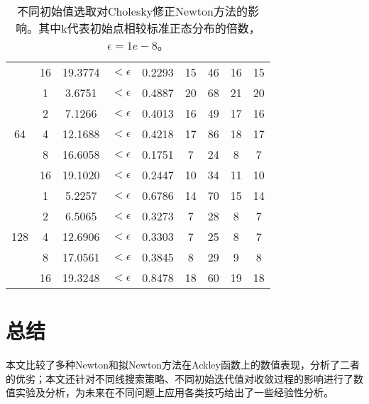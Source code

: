 \documentclass{article}
\begin{document}
\begin{table*}[h]
\begin{tabular}{c c c c c c c c c}
    & 16 & 19.3774 & $<\epsilon$ & 0.2293 & 15 & 46 & 16 & 15 \\
    \cmidrule(lr){1-9}
    \multirow{5}{*}{64} &
       1 &  3.6751 & $<\epsilon$ & 0.4887 & 20 & 68 & 21 & 20 \\
    &  2 &  7.1266 & $<\epsilon$ & 0.4013 & 16 & 49 & 17 & 16 \\
    &  4 & 12.1688 & $<\epsilon$ & 0.4218 & 17 & 86 & 18 & 17 \\
    &  8 & 16.6058 & $<\epsilon$ & 0.1751 &  7 & 24 &  8 & 7 \\
    & 16 & 19.1020 & $<\epsilon$ & 0.2447 & 10 & 34 & 11 & 10 \\
    \cmidrule(lr){1-9}
    \multirow{5}{*}{128} &
       1 &  5.2257 & $<\epsilon$ & 0.6786 & 14 & 70 & 15 & 14 \\
    &  2 &  6.5065 & $<\epsilon$ & 0.3273 &  7 & 28 &  8 & 7 \\
    &  4 & 12.6906 & $<\epsilon$ & 0.3303 &  7 & 25 &  8 & 7 \\
    &  8 & 17.0561 & $<\epsilon$ & 0.3845 &  8 & 29 &  9 & 8 \\
    & 16 & 19.3248 & $<\epsilon$ & 0.8478 & 18 & 60 & 19 & 18 \\
    \bottomrule
  \end{tabular}
  \caption{不同初始值选取对Cholesky修正Newton方法的影响。其中k代表初始点相较标准正态分布的倍数，$\epsilon=1e-8$。}
  \label{tab:init_value}
\end{table*}


\section{总结}
本文比较了多种Newton和拟Newton方法在Ackley函数上的数值表现，分析了二者的优劣；本文还针对不同线搜索策略、不同初始迭代值对收敛过程的影响进行了数值实验及分析，为未来在不同问题上应用各类技巧给出了一些经验性分析。


\end{document}
